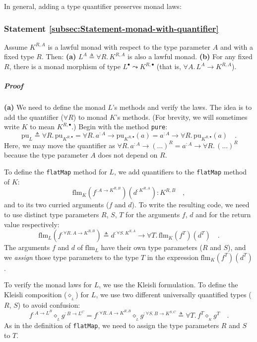 In general, adding a type quantifier preserves monad laws:

\subsubsection{Statement \label{subsec:Statement-monad-with-quantifier}\ref{subsec:Statement-monad-with-quantifier}}

Assume $K^{R,A}$ is a lawful monad with respect to the type parameter
$A$ and with a fixed type $R$. Then: \textbf{(a)} $L^{A}\triangleq\forall R.\,K^{R,A}$
is also a lawful monad. \textbf{(b)} For any fixed $R$, there is
a monad morphism of type $L^{\bullet}\leadsto K^{R,\bullet}$ (that
is, $\forall A.\,L^{A}\rightarrow K^{R,A}$).

\subparagraph{Proof}

\textbf{(a)} We need to define the monad $L$\textsf{'}s methods and verify
the laws. The idea is to add the quantifier ($\forall R$) to monad
$K$\textsf{'}s methods. (For brevity, we will sometimes write $K$ to mean
$K^{R,\bullet}$.) Begin with the method \lstinline!pure!:
\[
\text{pu}_{L}\triangleq\forall R.\,\text{pu}_{K^{R,\bullet}}=\forall R.\,a^{:A}\rightarrow\text{pu}_{K^{R,\bullet}}(a)=a^{:A}\rightarrow\forall R.\,\text{pu}_{K^{R,\bullet}}(a)\quad.
\]
Here, we may move the quantifier as $\forall R.\,a^{:A}\rightarrow(...)^{R}=a^{:A}\rightarrow\forall R.\,(...)^{R}$
because the type parameter $A$ does not depend on $R$.

To define the \lstinline!flatMap! method for $L$, we add quantifiers
to the \lstinline!flatMap! method of $K$:
\[
\text{flm}_{K}(f^{:A\rightarrow K^{R,B}})(d^{:K^{R,A}}):K^{R,B}\quad,
\]
and to its two curried arguments ($f$ and $d$). To write the resulting
code, we need to use distinct type parameters $R$, $S$, $T$ for
the arguments $f$, $d$ and for the return value respectively: 
\[
\text{flm}_{L}(f^{:\forall R.\,A\rightarrow K^{R,B}})\triangleq d^{:\forall S.\,K^{S,A}}\rightarrow\forall T.\,\text{flm}_{K}(f^{T})(d^{T})\quad.
\]
The arguments $f$ and $d$ of $\text{flm}_{L}$ have their own type
parameters ($R$ and $S$), and we \emph{assign} those type parameters
to the type $T$ in the expression $\text{flm}_{K}(f^{T})(d^{T})$.

To verify the monad laws for $L$, we use the Kleisli formulation.
To define the Kleisli composition ($\diamond_{_{L}}$) for $L$, we
use two different universally quantified types ($R$, $S$) to avoid
confusion:
\[
f^{:A\rightarrow L^{B}}\diamond_{_{L}}g^{:B\rightarrow L^{C}}=f^{:\forall R.\,A\rightarrow K^{R,B}}\diamond_{_{L}}g^{:\forall S.\,B\rightarrow K^{S,C}}\triangleq\forall T.\,f^{T}\diamond_{_{K}}g^{T}\quad.
\]
As in the definition of \lstinline!flatMap!, we need to assign the
type parameters $R$ and $S$ to $T$. 

